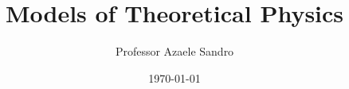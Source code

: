 \documentclass[
	a4paper,
	fontsize=10pt,
	twoside=true,
	open=any,
	numbers=noenddot,
]{kaobook}
\begin{document}
\titlehead{ Models of Theoretical Physics}
\subject{Notes for Models of Theoretical Physics}

\title[]{
Models of Theoretical Physics}
\subtitle{Professor Azaele Sandro}

\author[]{}

\date{\today}

\publishers{}

\frontmatter

    \makeatletter
    \uppertitleback{\@titlehead}
    \makeatother

    \maketitle
\begingroup %



\setlength{\textheight}{230\hscale} %

\etocstandarddisplaystyle %
\etocstandardlines %

\tableofcontents %
\listoflecture
\listoffigures %

\let\cleardoublepage\bigskip
\let\clearpage\bigskip

\listoftables %



\endgroup


\mainmatter %
\end{document}
